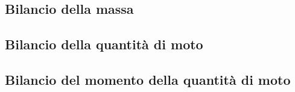 \documentclass[letterpaper,10pt,italian]{jupyterBook}
\begin{document}
\subsection{Bilancio della massa}
\label{\detokenize{ch/mechanics/dynamics-eom-open:bilancio-della-massa}}\label{\detokenize{ch/mechanics/dynamics-eom-open:physics-hs-mechanics-dynamics-eom-open-mass}}

\subsection{Bilancio della quantità di moto}
\label{\detokenize{ch/mechanics/dynamics-eom-open:bilancio-della-quantita-di-moto}}\label{\detokenize{ch/mechanics/dynamics-eom-open:physics-hs-mechanics-dynamics-eom-open-momentum}}

\subsection{Bilancio del momento della quantità di moto}
\label{\detokenize{ch/mechanics/dynamics-eom-open:bilancio-del-momento-della-quantita-di-moto}}\label{\detokenize{ch/mechanics/dynamics-eom-open:physics-hs-mechanics-dynamics-eom-open-angular-momentum}}
\end{document}
